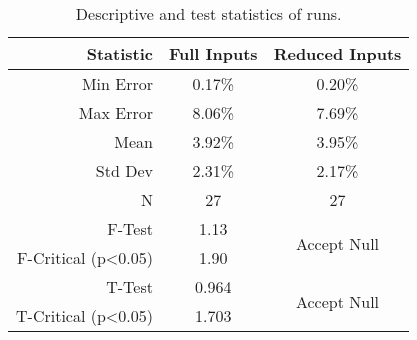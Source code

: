 \begin{table}[H]
\centering
\caption{Descriptive and test statistics of runs.}
\label{tb:RunStats}
\begin{tabular}{@{}rcc@{}}
\toprule
\textbf{Statistic}          & \textbf{Full Inputs} & \textbf{Reduced Inputs}      \\ \midrule
Min Error                   & 0.17\%               & 0.20\%                       \\
Max Error                   & 8.06\%               & 7.69\%                       \\
Mean                        & 3.92\%               & 3.95\%                       \\
Std Dev                     & 2.31\%               & 2.17\%                       \\
N                           & 27                   & 27                           \\ \hline
F-Test                      & 1.13                 & \multirow{2}{*}{Accept Null} \\
F-Critical (p\textless0.05) & 1.90                 &                              \\ \hline
T-Test                      & 0.964                & \multirow{2}{*}{Accept Null} \\
T-Critical (p\textless0.05) & 1.703                &                              \\ \bottomrule
\end{tabular}
\end{table}